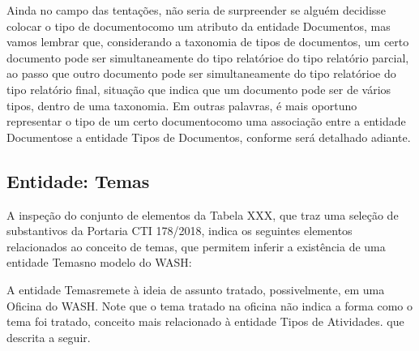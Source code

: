 \documentclass[
12pt,		%
openright,	%
twoside,  %
a4paper,			%
chapter=TITLE,		%
english,			%
french,				%
spanish,			%
brazil				%
]{USPSC-classe/USPSC}
\begin{document}
Ainda no campo das \textquotedbl tenta\c{c}\~oes\textquotedbl , n\~ao seria de surpreender se algu\'em decidisse colocar o \textquotedbl tipo de documento\textquotedbl  como um atributo da entidade \textquotedbl Documentos\textquotedbl , mas vamos lembrar que, considerando a taxonomia de tipos de documentos, um certo documento pode ser simultaneamente do tipo \textquotedbl relat\'orio\textquotedbl  e do tipo \textquotedbl relat\'orio parcial\textquotedbl , ao passo que outro documento pode ser simultaneamente do tipo \textquotedbl relat\'orio\textquotedbl  e do tipo \textquotedbl relat\'orio final\textquotedbl , situa\c{c}\~ao que indica que um documento pode ser de v\'arios tipos, dentro de uma taxonomia. Em outras palavras, \'e mais oportuno representar o \textquotedbl tipo de um certo documento\textquotedbl  como uma associa\c{c}\~ao entre a entidade \textquotedbl Documentos\textquotedbl  e a entidade \textquotedbl Tipos de Documentos\textquotedbl , conforme ser\'a detalhado adiante.


\subsection[Entidade: Temas]{Entidade: Temas}\label{Entidade: Temas}
A inspe\c{c}\~ao do conjunto de elementos da Tabela XXX, que traz uma sele\c{c}\~ao de substantivos da Portaria CTI 178/2018, indica os seguintes elementos relacionados ao conceito de \textquotedbl temas\textquotedbl , que permitem inferir a exist\^encia de uma entidade \textquotedbl Temas\textquotedbl  no modelo do WASH:



\noindent\begin{center}\mbox{\centering{}}\end{center}


A entidade \textquotedbl Temas\textquotedbl  remete \`a ideia de assunto tratado, possivelmente, em uma Oficina do WASH. Note que o tema tratado na oficina n\~ao indica a forma como o tema foi tratado, conceito mais relacionado \`a entidade \textquotedbl Tipos de Atividades\textquotedbl . que descrita a seguir.
\end{document}
